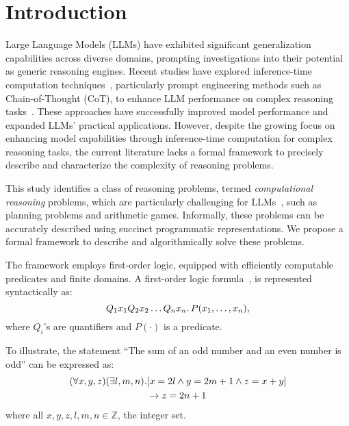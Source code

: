 \section{Introduction}

Large Language Models (LLMs) have exhibited significant generalization capabilities across diverse domains, prompting investigations into their potential as generic reasoning engines. Recent studies have explored inference-time computation techniques~\citep{welleck2024from,snell2024scalingllmtesttimecompute}, particularly prompt engineering methods such as Chain-of-Thought (CoT), to enhance LLM performance on complex reasoning tasks~\citep{wei2022chain}. These approaches have successfully improved model performance and expanded LLMs' practical applications. However, despite the growing focus on enhancing model capabilities through inference-time computation for complex reasoning tasks, the current literature lacks a formal framework to precisely describe and characterize the complexity of reasoning problems.


This study identifies a class of reasoning problems, termed \emph{computational reasoning} problems, which are particularly challenging for LLMs~\citep{yao2023tree,hao2024planningrigorgeneralpurposezeroshot,valmeekam2023planbench},
such as planning problems and arithmetic games.
Informally, these problems can be accurately described using succinct programmatic representations.
We propose a formal framework to describe and algorithmically solve these problems.

The framework employs first-order logic, equipped with efficiently computable predicates and finite domains. A first-order logic formula~\citep{kleene1971introduction},
is represented syntactically as:
\[
Q_1 x_1 Q_2 x_2\ldots Q_n x_n \ldotp P(x_1, \ldots, x_n),
\]
where $Q_i$'s are quantifiers and $P(\cdot)$ is a predicate.

To illustrate, the statement ``The sum of 
an odd number and an even number
is odd'' can be expressed as:
\begin{equation*}
\begin{split}
(\forall x, y, z ) (\exists l, m, n ) \ldotp & [x = 2l \land y = 2m+1 \land z = x+y] \\ &\rightarrow z=2n+1
\end{split}
\end{equation*}
where all $x, y, z, l, m, n \in \mathbb{Z}$, the integer set.


